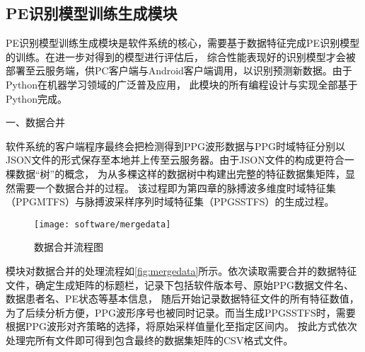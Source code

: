 
\subsection{PE识别模型训练生成模块}
PE识别模型训练生成模块是软件系统的核心，需要基于数据特征完成PE识别模型的训练。在进一步对得到的模型进行评估后，
综合性能表现好的识别模型才会被部署至云服务端，供PC客户端与Android客户端调用，以识别预测新数据。由于Python在机器学习领域的广泛普及应用，
此模块的所有编程设计与实现全部基于Python完成。

一、数据合并

软件系统的客户端程序最终会把检测得到PPG波形数据与PPG时域特征分别以JSON文件的形式保存至本地并上传至云服务器。由于JSON文件的构成更符合一棵数据“树”的概念，
为从多棵这样的数据树中构建出完整的特征数据集矩阵，显然需要一个数据合并的过程。
该过程即为第四章的脉搏波多维度时域特征集（PPGMTFS）与脉搏波采样序列时域特征集（PPGSSTFS）的生成过程。
\begin{figure}[htbp]
    \centering
    \texttt{[image: software/mergedata]}
    \caption{\label{fig:mergedata}数据合并流程图}
\end{figure}

模块对数据合并的处理流程如\autoref{fig:mergedata}所示。依次读取需要合并的数据特征文件，确定生成矩阵的标题栏，记录下包括软件版本号、原始PPG数据文件名、数据患者名、PE状态等基本信息，
随后开始记录数据特征文件的所有特征数值，为了后续分析方便，PPG波形序号也被同时记录。而当生成PPGSSTFS时，需要根据PPG波形对齐策略的选择，将原始采样值量化至指定区间内。
按此方式依次处理完所有文件即可得到包含最终的数据集矩阵的CSV格式文件。


